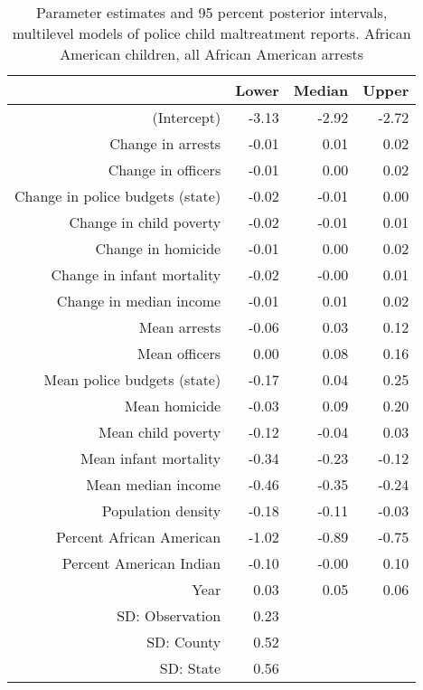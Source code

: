 \begin{table}[ht]
\centering
\begin{tabular}{rrrr}
  \hline
 & Lower & Median & Upper \\ 
  \hline
(Intercept) & -3.13 & -2.92 & -2.72 \\ 
  Change in arrests & -0.01 & 0.01 & 0.02 \\ 
  Change in officers & -0.01 & 0.00 & 0.02 \\ 
  Change in police budgets (state) & -0.02 & -0.01 & 0.00 \\ 
  Change in child poverty & -0.02 & -0.01 & 0.01 \\ 
  Change in homicide & -0.01 & 0.00 & 0.02 \\ 
  Change in infant mortality & -0.02 & -0.00 & 0.01 \\ 
  Change in median income & -0.01 & 0.01 & 0.02 \\ 
  Mean arrests & -0.06 & 0.03 & 0.12 \\ 
  Mean officers & 0.00 & 0.08 & 0.16 \\ 
  Mean police budgets (state) & -0.17 & 0.04 & 0.25 \\ 
  Mean homicide & -0.03 & 0.09 & 0.20 \\ 
  Mean child poverty & -0.12 & -0.04 & 0.03 \\ 
  Mean infant mortality & -0.34 & -0.23 & -0.12 \\ 
  Mean median income & -0.46 & -0.35 & -0.24 \\ 
  Population density & -0.18 & -0.11 & -0.03 \\ 
  Percent African American & -1.02 & -0.89 & -0.75 \\ 
  Percent American Indian & -0.10 & -0.00 & 0.10 \\ 
  Year & 0.03 & 0.05 & 0.06 \\ 
  SD: Observation & 0.23 &  &  \\ 
  SD: County & 0.52 &  &  \\ 
  SD: State & 0.56 &  &  \\ 
   \hline
\end{tabular}
\caption{Parameter estimates and 95 percent posterior intervals, multilevel models of 
             police child maltreatment reports. African American children, all African American arrests} 
\end{table}
